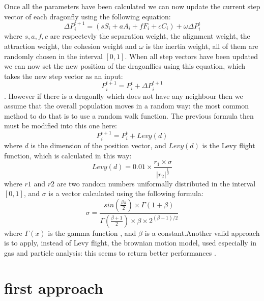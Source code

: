 \documentclass[10pt]{article}
\begin{document}
\begin{multicols}{2}
\noindent Once all the parameters have been calculated we can now update the current step vector of each dragonfly using the following equation: $$\Delta P^{t+1}_{i} = (sS_i + aA_i + fF_i + cC_i) + \omega\Delta P^t_i$$ where $s,a,f,c$ are respectevly the separation weight, the alignment weight, the attraction weight, the cohesion weight and $\omega$ is the inertia weight, all of them are randomly chosen in the interval $[0,1]$. When all step vectors have been updated we can now set the new position of the dragonflies using this equation, which takes the new step vector as an input: $$P^{t+1}_{i} = P_i^t + \Delta P_{i}^{t+1}$$. However if there is a dragonfly which does not have any neighbour then we assume that the overall population moves in a random way: the most common method to do that is to use a random walk function. The previous formula then must be modified into this one here: $$P^{t+1}_i = P_i^t + Levy(d)$$ where $d$ is the dimension of the position vector, and $Levy(d)$ is the Levy flight function, which is calculated in this way: $$Levy(d) = 0.01\times\frac{r_1 \times \sigma}{|r_2|^{\frac{1}{\beta}}}$$ where $r1$ and $r2$ are two random numbers uniformally distributed in the interval $[0,1]$, and $\sigma$ is a vector calculated using the following formula: $$\sigma = \frac{sin(\frac{\beta\pi}{2})\times\Gamma(1+\beta)}{\Gamma(\frac{\beta+1}{2})\times \beta \times 2^{(\beta-1)/2}}$$ where $\Gamma(x)$ is the gamma function \cite{WikiGamma}, and $\beta$ is a constant.Another valid approach is to apply, instead of Levy flight, the brownian motion model, used especially in gas and particle analysis: this seems to return better performances \cite{BDragonfly}. 

\section{first approach}

\end{multicols}



\end{document}
